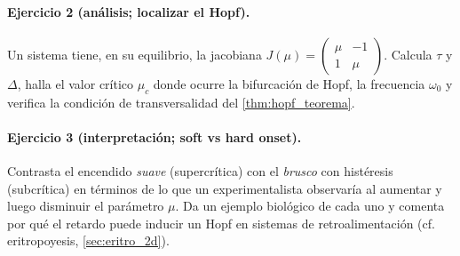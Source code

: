 \paragraph{Ejercicio 2 (análisis; localizar el Hopf).} Un sistema tiene, en su equilibrio, la jacobiana $J(\mu)=\begin{pmatrix}\mu & -1\\ 1 & \mu\end{pmatrix}$. Calcula $\tau$ y $\Delta$, halla el valor crítico $\mu_c$ donde ocurre la bifurcación de Hopf, la frecuencia $\omega_0$ y verifica la condición de transversalidad del \cref{thm:hopf_teorema}.

\paragraph{Ejercicio 3 (interpretación; soft vs hard onset).} Contrasta el encendido \emph{suave} (supercrítica) con el \emph{brusco} con histéresis (subcrítica) en términos de lo que un experimentalista observaría al aumentar y luego disminuir el parámetro $\mu$. Da un ejemplo biológico de cada uno y comenta por qué el retardo puede inducir un Hopf en sistemas de retroalimentación (cf. eritropoyesis, \cref{sec:eritro_2d}).
